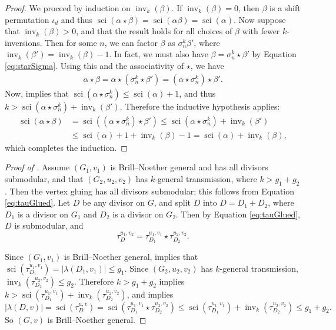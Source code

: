 \documentclass[11pt]{article}
\theoremstyle{definition}
\numberwithin{equation}{section}
\newcommand{\inv}{\operatorname{inv}}
\newcommand{\tauD}{\tau^{u,v}_D}
\newcommand{\sci}{\operatorname{sci}}
\begin{document}
\begin{proof}
We proceed by induction on $\inv_k(\beta)$. If $\inv_k(\beta) = 0$, then $\beta$ is a shift permutation $\iota_d$ and thus $\sci(\alpha\star \beta) = \sci(\alpha\beta) = \sci(\alpha)$.
Now suppose that $\inv_k(\beta) >0$, and that the result holds for all choices of $\beta$ with fewer $k$-inversions.
Then for some $n$, we can factor $\beta$ as $\sigma^k_n \beta'$, where $\inv_k(\beta') = \inv_k(\beta)-1$. In fact, we must also have $\beta = \sigma^k_n \star \beta'$ by Equation \eqref{eq:starSigma}.
Using this and the associativity of $\star$, we have
\begin{align*}
    \alpha \star \beta = \alpha \star (\sigma_n^k \star \beta') = (\alpha \star \sigma_n^k) \star \beta'.
\end{align*}
Now,  implies that $\sci(\alpha \star \sigma^k_n) \leq \sci(\alpha)+1$, and thus $k > \sci(\alpha \star \sigma^k_n) + \inv_k(\beta')$. Therefore the inductive hypothesis applies:
\begin{align*}
    \sci(\alpha \star \beta) &= \sci((\alpha \star \sigma_n^k) \star \beta') \leq \sci(\alpha \star \sigma_n^k) + \inv_k(\beta') \\&\leq \sci(\alpha) + 1 + \inv_k(\beta) -1 = \sci(\alpha) + \inv_k(\beta),
\end{align*}
which completes the induction.
\end{proof}

\begin{proof}[Proof of ]
Assume $(G_1, v_1)$ is Brill--Noether general and has all divisors submodular, and that $(G_2, u_2, v_2)$ has $k$-general transmission, where $k > g_1 + g_2$. 
Then the vertex gluing has all divisors submodular; this follows from Equation \eqref{eq:tauGlued}. 
Let $D$ be any divisor on $G$, and split $D$ into $D = D_1 + D_2$, where $D_1$ is a divisor on $G_1$ and $D_2$ is a divisor on $G_2$. Then by Equation \eqref{eq:tauGlued}, $D$ is submodular, and
$$\tau_D^{u_1,v_2} = \tau_{D_1}^{u_1, v_1} \star \tau_{D_2}^{u_2,v_2}.$$

Since $(G_1, v_1)$ is Brill--Noether general,  implies that $\sci(\tau_{D_1}^{u_1, v_1}) = |\lambda(D_1, v_1)| \leq g_1$. Since $(G_2, u_2, v_2)$ has $k$-general transmission, $\inv_k(\tau_{D_2}^{u_2,v_2}) \leq g_2$. Therefore $k > g_1 + g_2$ implies $k > \sci(\tau_{D_1}^{u_1,v_1}) + \inv_k(\tau_{D_2}^{u_2,v_2})$, and  implies
$$ |\lambda(D,v)| = \sci(\tauD) = \sci(\tau_{D_1}^{u_1,v_1} \star \tau_{D_2}^{u_2,v_2}) \leq \sci(\tau_{D_1}^{u_1,v_1}) + \inv_k(\tau_{D_2}^{u_2,v_2}) \leq g_1 + g_2.$$
So $(G,v)$ is Brill--Noether general.
\end{proof}
\end{document}
